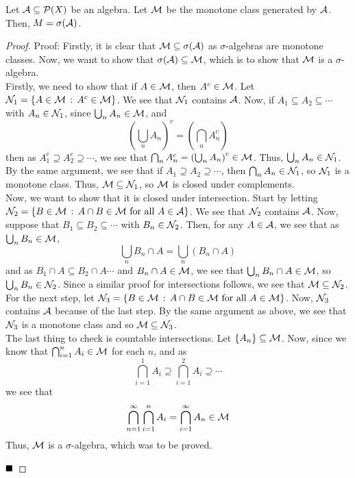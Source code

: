 \begin{theorem}
    Let $\cal{A} \subseteq \cal{P}(X)$ be an algebra. Let $\cal{M}$ be the monotone class generated by $\cal{A}$. Then, $M = \sigma(\cal{A})$. 
\end{theorem}
\begin{proof}{Proof:}
    Firstly, it is clear that $\cal{M} \subseteq \sigma(\cal{A})$ as $\sigma$-algebras are monotone classes. Now, we want to show that $\sigma(\cal{A}) \subseteq \cal{M}$, which is to show that $\cal{M}$ is a $\sigma$-algebra.\\
    
    Firstly, we need to show that if $A \in \cal{M}$, then $A^{c} \in \cal{M}$. Let $\cal{N}_1 = \{A \in \cal{M} \col A^{c} \in \cal{M}\}$. We see that $\cal{N}_1$ contains $\cal{A}$. Now, if $A_1 \subseteq A_2 \subseteq \cdots$ with $A_n \in \cal{N}_1$, since $\bigcup_{n} A_n \in \cal{M}$, and
    \[ \left(\bigcup_{n} A_n\right)^{c} = \left(\bigcap_{n} A_n^{c}\right) \]
    then as $A_1^{c} \supseteq A_2^{c} \supseteq \cdots$, we see that $\bigcap_{n} A_n^{c} = \left(\bigcup_{n} A_n\right)^{c} \in \cal{M}$. Thus, $\bigcup_{n} A_n \in \cal{N}_1$. By the same argument, we see that if $A_1 \supseteq A_2 \supseteq \cdots$, then $\bigcap_{n} A_n \in \cal{N}_1$, so $\cal{N}_1$ is a monotone class. Thus, $\cal{M} \subseteq \cal{N}_1$, so $\cal{M}$ is closed under complements.\\

    Now, we want to show that it is closed under intersection. Start by letting $\cal{N}_2 = \{B \in \cal{M} \col A \cap B \in \cal{M} \text{ for all } A \in \cal{A}\}$. We see that $\cal{N}_2$ contains $\cal{A}$. Now, suppose that $B_1 \subseteq B_2 \subseteq \cdots$ with $B_n \in \cal{N}_2$. Then, for any $A \in \cal{A}$, we see that as $\bigcup_{n} B_n \in \cal{M}$,
    \[ \bigcup_{n} B_n \cap A = \bigcup_{n} (B_n \cap A) \]
    and as $B_1 \cap A \subseteq B_2 \cap A \cdots$ and $B_n \cap A \in \cal{M}$, we see that $\bigcup_{n} B_n \cap A \in \cal{M}$, so $\bigcup_{n} B_n \in \cal{N}_2$. Since a similar proof for intersections follows, we see that $\cal{M} \subseteq \cal{N}_2$.\\

    For the next step, let $\cal{N}_3 = \{B \in \cal{M} \col A \cap B \in \cal{M} \tt{ for all } A \in \cal{M}\}$. Now, $\cal{N}_3$ contains $\cal{A}$ because of the last step. By the same argument as above, we see that $\cal{N}_3$ is a monotone class and so $\cal{M} \subseteq \cal{N}_3$.\\
    
    The last thing to check is countable intersections. Let $\{A_n\} \subseteq \cal{M}$. Now, since we know that $\bigcap_{i = 1}^{n} A_i \in \cal{M}$ for each $n$, and as
    \[ \bigcap_{i = 1}^{1} A_i \supseteq \bigcap_{i = 1}^{2} A_i \supseteq \cdots \]
    we see that
    \[ \bigcap_{n = 1}^{\infty} \bigcap_{i = 1}^{n} A_i = \bigcap_{i = 1}^{\infty} A_n \in \cal{M} \]
    Thus, $\cal{M}$ is a $\sigma$-algebra, which was to be proved.

    $\qed$
\end{proof}

